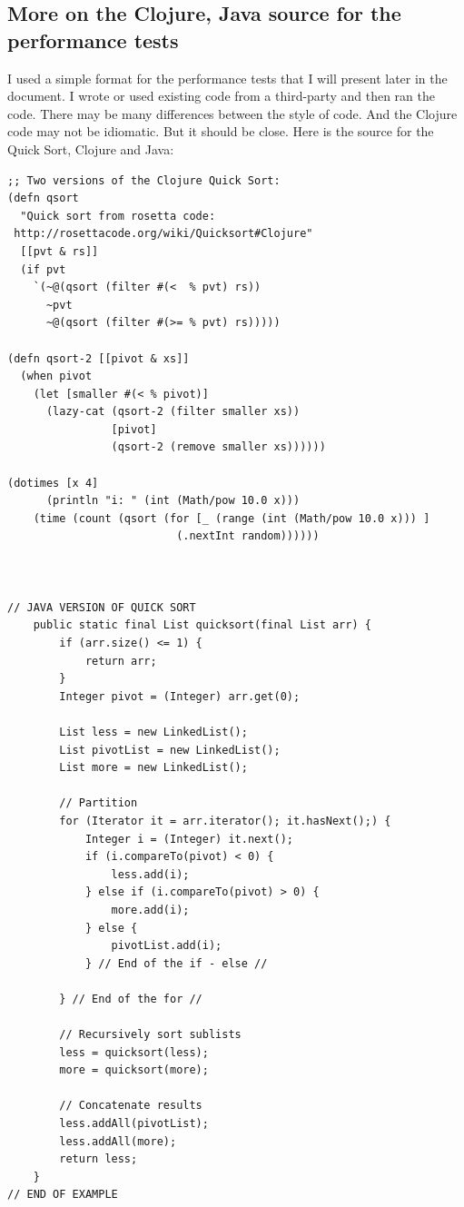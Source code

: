 \subsection{More on the Clojure, Java source for the performance tests}

I used a simple format for the performance tests that I will present later in the document. I wrote or used existing code from a third-party and then ran the code. There may be many differences between the style of code. And the Clojure code may not be idiomatic. But it should be close. Here is the source for the Quick Sort, Clojure and Java:

\begin{verbatim}
;; Two versions of the Clojure Quick Sort:
(defn qsort 
  "Quick sort from rosetta code:
 http://rosettacode.org/wiki/Quicksort#Clojure"
  [[pvt & rs]]
  (if pvt
    `(~@(qsort (filter #(<  % pvt) rs))
      ~pvt 
      ~@(qsort (filter #(>= % pvt) rs)))))

(defn qsort-2 [[pivot & xs]]
  (when pivot
    (let [smaller #(< % pivot)]
      (lazy-cat (qsort-2 (filter smaller xs))
                [pivot]
                (qsort-2 (remove smaller xs))))))

(dotimes [x 4]
      (println "i: " (int (Math/pow 10.0 x)))
    (time (count (qsort (for [_ (range (int (Math/pow 10.0 x))) ] 
                          (.nextInt random))))))



// JAVA VERSION OF QUICK SORT
    public static final List quicksort(final List arr) {
        if (arr.size() <= 1) {
            return arr;
        }
        Integer pivot = (Integer) arr.get(0);
     
        List less = new LinkedList();
        List pivotList = new LinkedList();
        List more = new LinkedList();
     
        // Partition
        for (Iterator it = arr.iterator(); it.hasNext();) {
            Integer i = (Integer) it.next();
            if (i.compareTo(pivot) < 0) {
                less.add(i);
            } else if (i.compareTo(pivot) > 0) {
                more.add(i);
            } else {
                pivotList.add(i);
            } // End of the if - else //
            
        } // End of the for //
     
        // Recursively sort sublists
        less = quicksort(less);
        more = quicksort(more);
     
        // Concatenate results
        less.addAll(pivotList);
        less.addAll(more);
        return less;
    }
// END OF EXAMPLE 
\end{verbatim}

